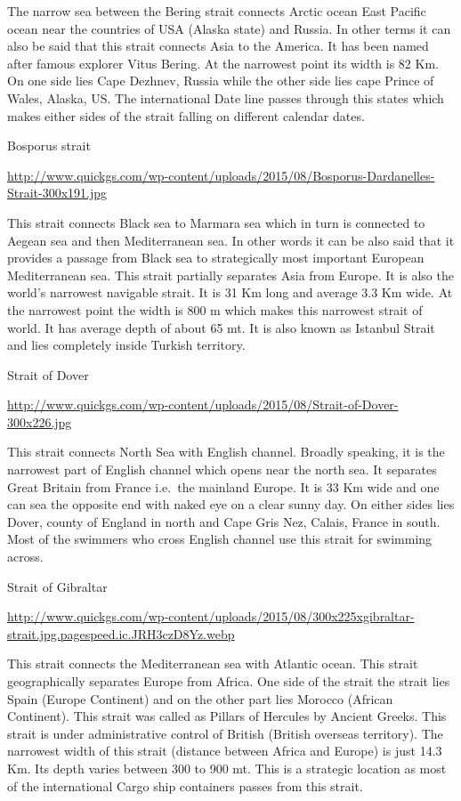 \documentclass[
  openany]{book}
\begin{document}
The narrow sea between the Bering strait connects Arctic ocean East Pacific ocean near the countries of USA (Alaska state) and Russia. In other terms it can also be said that this strait connects Asia to the America. It has been named after famous explorer Vitus Bering. At the narrowest point its width is 82 Km. On one side lies Cape Dezhnev, Russia while the other side lies cape Prince of Wales, Alaska, US. The international Date line passes through this states which makes either sides of the strait falling on different calendar dates.

Bosporus strait

\url{http://www.quickgs.com/wp-content/uploads/2015/08/Bosporus-Dardanelles-Strait-300x191.jpg}

This strait connects Black sea to Marmara sea which in turn is connected to Aegean sea and then Mediterranean sea. In other words it can be also said that it provides a passage from Black sea to strategically most important European Mediterranean sea. This strait partially separates Asia from Europe. It is also the world's narrowest navigable strait. It is 31 Km long and average 3.3 Km wide. At the narrowest point the width is 800 m which makes this narrowest strait of world. It has average depth of about 65 mt. It is also known as Istanbul Strait and lies completely inside Turkish territory.

Strait of Dover

\url{http://www.quickgs.com/wp-content/uploads/2015/08/Strait-of-Dover-300x226.jpg}

This strait connects North Sea with English channel. Broadly speaking, it is the narrowest part of English channel which opens near the north sea. It separates Great Britain from France i.e.~the mainland Europe. It is 33 Km wide and one can sea the opposite end with naked eye on a clear sunny day. On either sides lies Dover, county of England in north and Cape Gris Nez, Calais, France in south. Most of the swimmers who cross English channel use this strait for swimming across.

Strait of Gibraltar

\url{http://www.quickgs.com/wp-content/uploads/2015/08/300x225xgibraltar-strait.jpg.pagespeed.ic.JRH3czD8Yz.webp}

This strait connects the Mediterranean sea with Atlantic ocean. This strait geographically separates Europe from Africa. One side of the strait the strait lies Spain (Europe Continent) and on the other part lies Morocco (African Continent). This strait was called as Pillars of Hercules by Ancient Greeks. This strait is under administrative control of British (British overseas territory). The narrowest width of this strait (distance between Africa and Europe) is just 14.3 Km. Its depth varies between 300 to 900 mt. This is a strategic location as most of the international Cargo ship containers passes from this strait.
\end{document}
